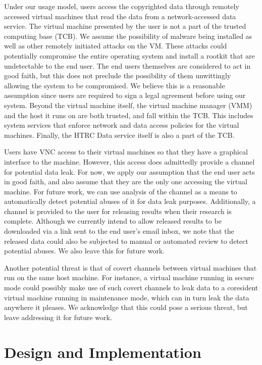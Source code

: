 \documentclass{acm_proc_article-sp}
\begin{document}
Under our usage model, users access the copyrighted data through remotely
accessed virtual machines that read the data from a network-accessed data
service.  The virtual machine presented by the user is not a part of the trusted
computing base (TCB).  We assume the possibility of malware being installed as
well as other remotely initiated attacks on the VM.  These attacks could
potentially compromise the entire operating system and install a rootkit that
are undetectable to the end user.  The end users themselves are considered to
act in good faith, but this does not preclude the possibility of them
unwittingly allowing the system to be compromised.  We believe this is a
reasonable assumption since users are required to sign a legal agreement before
using our system.  Beyond the virtual machine itself, the virtual machine
manager (VMM) and the host it runs on are both trusted, and fall within the TCB.
This includes system services that enforce network and data access policies for
the virtual machines.  Finally, the HTRC Data service itself is also a part of
the TCB.

Users have VNC access to their virtual machines so that they have a graphical
interface to the machine.  However, this access does admittedly provide a
channel for potential data leak.  For now, we apply our assumption that the end
user acts in good faith, and also assume that they are the only one accessing
the virtual machine.  For future work, we can use analysis of the channel as a
means to automatically detect potential abuses of it for data leak purposes.
Additionally, a channel is provided to the user for releasing results when their
research is complete.  Although we currently intend to allow released results to
be downloaded via a link sent to the end user's email inbox, we note that the
released data could also be subjected to manual or automated review to detect
potential abuses.  We also leave this for future work.

Another potential threat is that of covert channels between virtual machines
that run on the same host machine.  For instance, a virtual machine running in
secure mode could possibly make use of such covert channels to leak data to a
coresident virtual machine running in maintenance mode, which can in turn leak
the data anywhere it pleases.  We acknowledge that this could pose a serious
threat, but leave addressing it for future work.

\section{Design and Implementation} \label{title:design}
\end{document}
